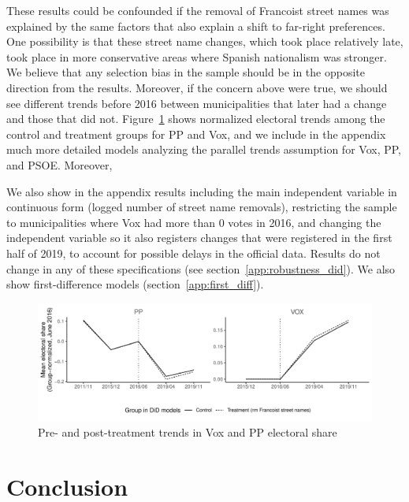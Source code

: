 \documentclass[12pt, notitlepage]{article}
\begin{document}
These results could be confounded if the removal of Francoist street names was explained by the same factors that also explain a shift to far-right preferences.
One possibility is that these street name changes, which took place relatively late, took place in more conservative areas where Spanish nationalism was stronger.
We believe that any selection bias in the sample should be in the opposite direction from the results.
Moreover, if the concern above were true, we should see different trends before 2016 between municipalities that later had a change and those that did not.
Figure~\ref{fig:par_trends_norm} shows normalized electoral trends among the control and treatment groups for PP and Vox, and we include in the appendix much more detailed models analyzing the parallel trends assumption for Vox, PP, and PSOE.
Moreover,

We also show in the appendix results including the main independent variable in continuous form (logged number of street name removals), restricting the sample to municipalities where Vox had more than 0 votes in 2016, and changing the independent variable so it also registers changes that were registered in the first half of 2019, to account for possible delays in the official data.
Results do not change in any of these specifications (see section~\ref{app:robustness_did}). We also show first-difference models (section~\ref{app:first_diff}).


\begin{figure}[htb!]
\centering

  \includegraphics[width = \textwidth]{img/par_trends_norm}

  \caption{Pre- and post-treatment trends in Vox and PP electoral share}\label{fig:par_trends_norm}

\end{figure}

\section*{Conclusion}
\end{document}
